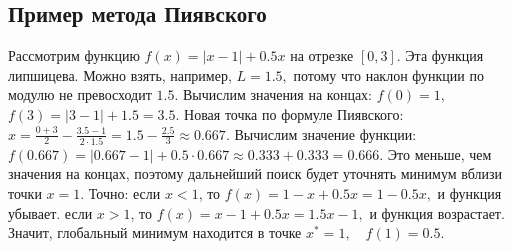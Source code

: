 \documentclass[12pt,a4paper]{article}
\begin{document}
\subsection{Пример метода Пиявского}
Рассмотрим функцию $f(x)=|x-1|+0.5x$
на отрезке $[0,3]$.
Эта функция липшицева. Можно взять, например, $L=1.5,$
потому что наклон функции по модулю не превосходит $1.5$.
Вычислим значения на концах: $f(0)=1,$ $f(3)=|3-1|+1.5=3.5.$
Новая точка по формуле Пиявского: $x = \frac{0+3}{2} - \frac{3.5-1}{2\cdot 1.5} = 1.5 - \frac{2.5}{3} \approx 0.667.$
Вычислим значение функции: $f(0.667)=|0.667-1|+0.5\cdot 0.667 \approx 0.333+0.333 =0.666.$
Это меньше, чем значения на концах, поэтому дальнейший поиск будет уточнять минимум вблизи точки $x=1$. Точно:
если $x<1$, то $f(x)=1-x+0.5x=1-0.5x,$
и функция убывает.
если $x>1$, то $f(x)=x-1+0.5x=1.5x-1,$
и функция возрастает.
Значит, глобальный минимум находится в точке $x^*=1,\quad f(1)=0.5.$
\end{document}
